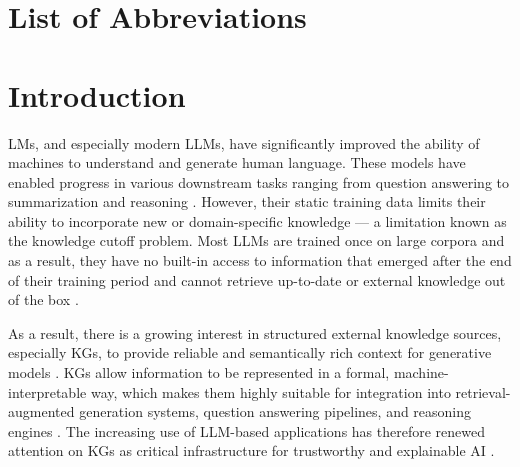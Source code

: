 \documentclass[a4paper,oneside,bibliography=totoc]{scrbook}
\begin{document}
\chapter{List of Abbreviations}
\begin{acronym}

\end{acronym}

\mainmatter

\chapter{Introduction}
\label{ch:introduction}

\acp{LM}, and especially modern \acp{LLM}, have significantly improved the ability of machines to understand and generate human language. These models have enabled progress in various downstream tasks ranging from question answering to summarization and reasoning \cite{Brown2020}. However, their static training data limits their ability to incorporate new or domain-specific knowledge — a limitation known as the knowledge cutoff problem. Most \acp{LLM} are trained once on large corpora and as a result, they have no built-in access to information that emerged after the end of their training period and cannot retrieve up-to-date or external knowledge out of the box \cite{Brown2020,Grattafiori2024}.

As a result, there is a growing interest in structured external knowledge sources, especially \acp{KG}, to provide reliable and semantically rich context for generative models \cite{Korolov2025}. \acp{KG} allow information to be represented in a formal, machine-interpretable way, which makes them highly suitable for integration into retrieval-augmented generation systems, question answering pipelines, and reasoning engines \cite{Korolov2025,Paulheim2016}. The increasing use of \ac{LLM}-based applications has therefore renewed attention on \acp{KG} as critical infrastructure for trustworthy and explainable \ac{AI} \cite{Korolov2025}.
\end{document}
